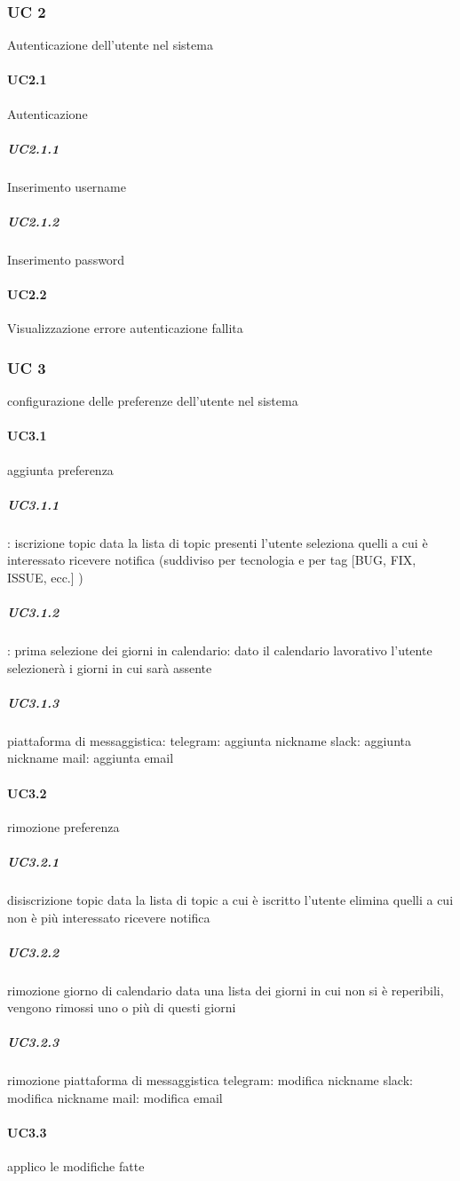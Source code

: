 \subsubsection{UC 2}
	Autenticazione dell'utente nel sistema
	\paragraph{UC2.1}
		Autenticazione
			\subparagraph{UC2.1.1}
				Inserimento username
			\subparagraph{UC2.1.2}
				Inserimento password
	\paragraph{UC2.2}
		Visualizzazione errore autenticazione fallita


\subsubsection{UC 3}
configurazione delle preferenze dell'utente nel sistema

	\paragraph{UC3.1}
	aggiunta preferenza
		\subparagraph{UC3.1.1}:
		iscrizione topic
			data la lista di topic presenti l'utente seleziona quelli a cui è interessato ricevere notifica (suddiviso per tecnologia e per tag [BUG, FIX, ISSUE, ecc.] )
		\subparagraph{UC3.1.2}:
		prima selezione dei giorni in calendario:
			dato il calendario lavorativo l'utente selezionerà i giorni in cui sarà assente
		\subparagraph{UC3.1.3}
		piattaforma di messaggistica:
			telegram: aggiunta nickname
			slack: aggiunta nickname
			mail: aggiunta email

	\paragraph{UC3.2}
	rimozione preferenza
		\subparagraph{UC3.2.1}
		disiscrizione topic
			data la lista di topic a cui è iscritto l'utente elimina quelli a cui non è più interessato ricevere notifica
		\subparagraph{UC3.2.2}
		rimozione giorno di calendario
			data una lista dei giorni in cui non si è reperibili, vengono rimossi uno o più di questi giorni
		\subparagraph{UC3.2.3}
		rimozione piattaforma di messaggistica
			telegram: modifica nickname
			slack: modifica nickname
			mail: modifica email
			
	\paragraph{UC3.3}
	applico le modifiche fatte
	
